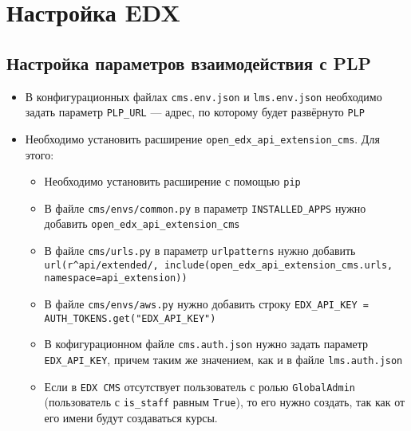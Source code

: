 \section{Настройка EDX}
\subsection{Настройка параметров взаимодействия с PLP}
\begin{itemize}
	\item В конфигурационных файлах \texttt{cms.env.json} и \texttt{lms.env.json} необходимо задать параметр \texttt{PLP\_URL} ---
		адрес, по которому будет развёрнуто \texttt{PLP}
	\item Необходимо установить расширение \texttt{open\_edx\_api\_extension\_cms}. Для этого:
	\begin{itemize}
		\item Необходимо установить расширение с помощью \texttt{pip}
		\item В файле \texttt{cms/envs/common.py} в параметр \texttt{INSTALLED\_APPS} нужно добавить \texttt{\textquotesingle{}open\_edx\_api\_extension\_cms\textquotesingle{}}
		\item В файле \texttt{cms/urls.py} в параметр \texttt{urlpatterns} нужно добавить
			\texttt{url(r\textquotesingle{}\^{}api/extended/\textquotesingle{}, include(\textquotesingle{}open\_edx\_api\_extension\_cms.urls\textquotesingle{}, namespace=\textquotesingle{}api\_extension\textquotesingle{}))}
		\item В файле \texttt{cms/envs/aws.py} нужно добавить строку \texttt{EDX\_API\_KEY = AUTH\_TOKENS.get("EDX\_API\_KEY")}
		\item В кофигурационном файле \texttt{cms.auth.json} нужно задать параметр \texttt{EDX\_API\_KEY},
			причем таким же значением, как и в файле \texttt{lms.auth.json}
		\item Если в \texttt{EDX CMS} отсутствует пользователь с ролью \texttt{GlobalAdmin} (пользователь с \texttt{is\_staff} равным \texttt{True}),
			то его нужно создать, так как от его имени будут создаваться курсы.
	\end{itemize}
\end{itemize}
